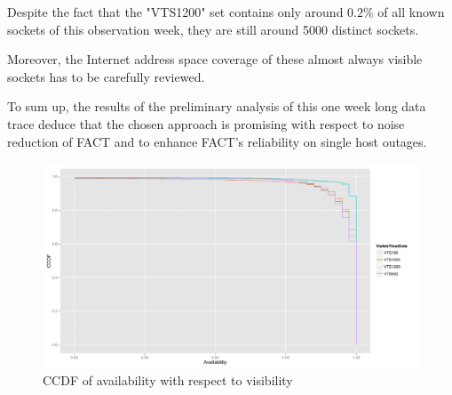 \documentclass{sigcomm-alternate}
\begin{document}
Despite the fact that the "VTS1200" set contains only around $0.2\%$
of all known sockets of this observation week, they are still around
5000 distinct sockets.

Moreover, the Internet address space coverage of these almost always
visible sockets has to be carefully reviewed.

To sum up, the results of the preliminary analysis of this one week
long data trace deduce that the chosen approach is promising with
respect to noise reduction of FACT and to enhance FACT's reliability
on single host outages.

\begin{figure}[ht!]
\centering \includegraphics[width=18cm]{images/RATIO_VTS_External.pdf}
\caption{CCDF of availability with respect to visibility}
\label{fig:RatioVTS}
\end{figure}



\end{document}
